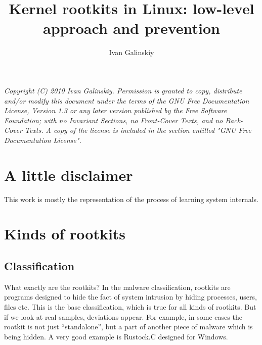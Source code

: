 \documentclass[12pt]{article}
\title{Kernel rootkits in Linux: low-level approach and prevention}
\date{}
\author{Ivan Galinskiy}
\begin{document}
\maketitle
  \emph{
  Copyright (C) 2010 Ivan Galinskiy.
    Permission is granted to copy, distribute and/or modify this document
    under the terms of the GNU Free Documentation License, Version 1.3
    or any later version published by the Free Software Foundation;
    with no Invariant Sections, no Front-Cover Texts, and no Back-Cover Texts.
    A copy of the license is included in the section entitled "GNU
    Free Documentation License".}

  \section{A little disclaimer}

  This work is mostly the representation of the process of learning
  system internals.
  
  \section{Kinds of rootkits}
  \subsection{Classification}
  What exactly are the rootkits? In the malware classification, rootkits are
  programs designed to hide the fact of system intrusion by hiding processes,
  users, files etc. This is the base classification, which is true for all
  kinds of rootkits. But if we look at real samples, deviations appear. For
  example, in some cases the rootkit is not just ``standalone'', but a part of
  another piece of malware which is being hidden. A very good example is
  Rustock.C designed for Windows.
\end{document}
